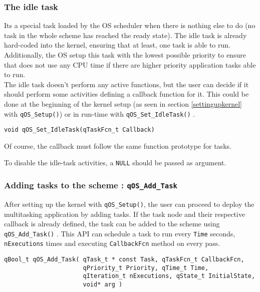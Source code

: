 \subsubsection{The idle task}
Its a special task loaded by the OS scheduler when there is nothing else to do (no task in the whole scheme has reached the ready state). The idle task is already hard-coded into the kernel, ensuring that at least, one task is able to run. Additionally, the OS setup this task with the lowest possible priority to ensure that does not use any CPU time if there are higher priority application tasks able to run. \\
The idle task doesn't perform any active functions, but the user can decide if it should perform some activities defining a callback function for it. This could be done at the beginning of the kernel setup (as seen in section \ref{settingupkernel} with \lstinline{qOS_Setup()}) or in run-time with \lstinline{qOS_Set_IdleTask()} . \\

\begin{lstlisting}[style=CStyle]
void qOS_Set_IdleTask(qTaskFcn_t Callback)
\end{lstlisting}

Of course, the callback must follow the same function prototype for tasks. \\

\begin{tcolorbox}
\HandRight To disable the idle-task activities, a \lstinline{NULL} should be passed as argument.
\end{tcolorbox}

\subsubsection{Adding tasks to the scheme : \lstinline{qOS_Add_Task} } \label{addtask}
After setting up the kernel with \lstinline{qOS_Setup()}, the user can proceed to deploy the multitasking application by adding tasks. If the task node and their respective callback is already defined, the task can be added to the scheme using \lstinline{qOS_Add_Task()} . This API can schedule a task to run every \lstinline{Time} seconds, \lstinline{nExecutions} times and executing \lstinline{CallbackFcn} method on every pass.\\

\begin{lstlisting}[style=CStyle]
qBool_t qOS_Add_Task( qTask_t * const Task, qTaskFcn_t CallbackFcn, 
                      qPriority_t Priority, qTime_t Time, 
                      qIteration_t nExecutions, qState_t InitialState, 
                      void* arg )
\end{lstlisting}

